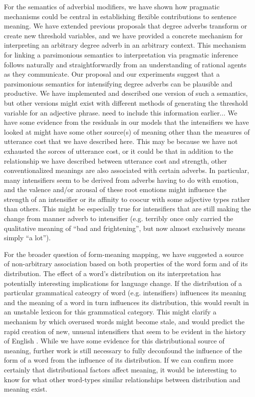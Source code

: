 \documentclass[10pt,letterpaper]{article}
\newcommand{\todo}[1]{{\color{red}#1}}
\begin{document}
For the semantics of adverbial modifiers, we have shown how pragmatic mechanisms could be central in establishing flexible contributions to sentence meaning.
We have extended previous proposals that degree adverbs transform or create new threshold variables, and we have provided a concrete mechanism for interpreting an arbitrary degree adverb in an arbitrary context.
This mechanism for linking a parsimonious semantics to interpretation via pragmatic inference follows naturally and straightforwardly from an understanding of rational agents as they communicate.
Our proposal and our experiments suggest that a parsimonious semantics for intensifying degree adverbs can be plausible and productive.
We have implemented and described one version of such a semantics, but other versions might exist with different methods of generating the threshold variable for an adjective phrase.
\todo{need to include this information earlier...} We have some evidence from the residuals in our models that the intensifiers we have looked at might have some other source(s) of meaning other than the measures of utterance cost that we have described here. This may be because we have not exhausted the sorces of utterance cost, or it could be that in addition to the relationship we have described between utterance cost and strength, other conventionalized meanings are also associated with certain adverbs. In particular, many intensifiers seem to be derived from adverbs having to do with emotion, and the valence and/or arousal of these root emotions might influence the strength of an intensifier or its affinity to coocur with some adjective types rather than others. This might be especially true for intensifiers that are still making the change from manner adverb to intensifier (e.g. terribly once only carried the qualitative meaning of ``bad and frightening'', but now almost exclusively means simply ``a lot'').

For the broader question of form-meaning mapping, we have suggested a source of non-arbitrary association based on both properties of the word form and of its distribution. The effect of a word's distribution on its interpretation has potentially interesting implications for language change. If the distribution of a particular grammatical cateogry of word (e.g. intensifiers) influences its meaning and the meaning of a word in turn influences its distribution, this would result in an unstable lexicon for this grammatical category. This might clarify a mechanism by which overused words might become stale, and would predict the rapid creation of new, unusual intensifiers that seem to be evident in the history of English \cite{bolinger}. While we have some evidence for this distributional source of meaning, further work is still necessary to fully deconfound the influence of the form of a word from the influence of its distribution. If we can confirm more certainly that distributional factors affect meaning, it would be interesting to know for what other word-types similar relationships between distribution and meaning exist.
\end{document}
